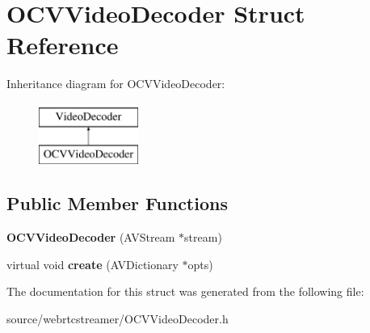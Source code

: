 \hypertarget{struct_o_c_v_video_decoder}{}\section{O\+C\+V\+Video\+Decoder Struct Reference}
\label{struct_o_c_v_video_decoder}
Inheritance diagram for O\+C\+V\+Video\+Decoder\+:\begin{figure}[H]
\begin{center}
\leavevmode
\includegraphics[height=2.000000cm]{d2/d9a/struct_o_c_v_video_decoder}
\end{center}
\end{figure}
\subsection*{Public Member Functions}
\begin{DoxyCompactItemize}
\item 
\mbox{\label{struct_o_c_v_video_decoder_ad2d7a37dc4b91db8b36c0dae7fd93a4d}} 
{\bfseries O\+C\+V\+Video\+Decoder} (A\+V\+Stream $\ast$stream)
\item 
\mbox{\label{struct_o_c_v_video_decoder_a7592719739bfb574168c3549f797e1ef}} 
virtual void {\bfseries create} (A\+V\+Dictionary $\ast$opts)
\end{DoxyCompactItemize}


The documentation for this struct was generated from the following file\+:\begin{DoxyCompactItemize}
\item 
source/webrtcstreamer/O\+C\+V\+Video\+Decoder.\+h\end{DoxyCompactItemize}
